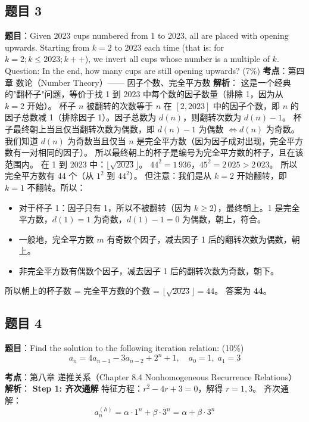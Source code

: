 \documentclass[10pt,a4paper,openany]{ctexbook}
\theoremstyle{definition}
\theoremstyle{remark}
\begin{document}
\subsection{题目 3}

\textbf{题目}：Given 2023 cups numbered from 1 to 2023, all are placed with opening upwards. Starting from $k = 2$ to 2023 each time (that is: for $k = 2; k \leq 2023; k++$), we invert all cups whose number is a multiple of $k$. Question: In the end, how many cups are still opening upwards? (7\%)
\textbf{考点}：第四章 数论（Number Theory）—— 因子个数、完全平方数
\textbf{解析}：
这是一个经典的"翻杯子"问题，等价于找 1 到 2023 中每个数的因子数量（排除 1，因为从 $k=2$ 开始）。
杯子 $n$ 被翻转的次数等于 $n$ 在 $[2, 2023]$ 中的因子个数，即 $n$ 的因子总数减 1（排除因子 1）。因子总数为 $d(n)$，则翻转次数为 $d(n) - 1$。
杯子最终朝上当且仅当翻转次数为偶数，即 $d(n) - 1$ 为偶数 $\iff d(n)$ 为奇数。
我们知道 $d(n)$ 为奇数当且仅当 $n$ 是完全平方数（因为因子成对出现，完全平方数有一对相同的因子）。
所以最终朝上的杯子是编号为完全平方数的杯子，且在该范围内。
在 1 到 2023 中：$\lfloor \sqrt{2023} \rfloor$。
$44^2 = 1\,936$，$45^2 = 2\,025 > 2\,023$。
所以完全平方数有 44 个（从 $1^2$ 到 $44^2$）。
但注意：我们是从 $k = 2$ 开始翻转，即 $k=1$ 不翻转。所以：
\begin{itemize}
\item 对于杯子 1：因子只有 1，所以不被翻转（因为 $k \geq 2$），最终朝上。1 是完全平方数，$d(1) = 1$ 为奇数，$d(1)-1 = 0$ 为偶数，朝上，符合。
\item 一般地，完全平方数 $m$ 有奇数个因子，减去因子 1 后的翻转次数为偶数，朝上。
\item 非完全平方数有偶数个因子，减去因子 1 后的翻转次数为奇数，朝下。

\end{itemize}

所以朝上的杯子数 = 完全平方数的个数 = $\lfloor \sqrt{2023} \rfloor = 44$。
答案为 \textbf{44}。
\vspace{-2pt}

\subsection{题目 4}

\textbf{题目}：Find the solution to the following iteration relation: (10\%)
\[
a_n = 4a_{n-1} - 3a_{n-2} + 2^n + 1,\quad a_0 = 1,\; a_1 = 3
\]

\textbf{考点}：第八章 递推关系（Chapter 8.4 Nonhomogeneous Recurrence Relations）
\textbf{解析}：
\textbf{Step 1: 齐次通解}
特征方程：$r^2 - 4r + 3 = 0$，解得 $r = 1, 3$。
齐次通解：
\[
a_n^{(h)} = \alpha \cdot 1^n + \beta \cdot 3^n = \alpha + \beta \cdot 3^n
\]
\end{document}
